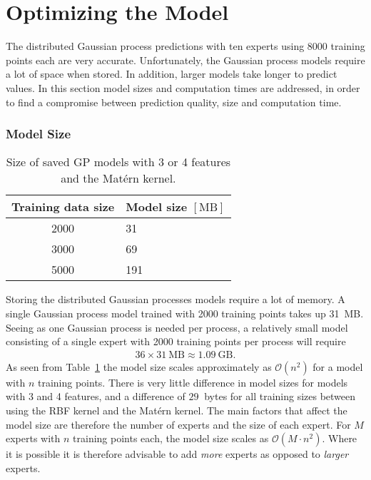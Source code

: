 \documentclass[twoside,english]{uiofysmaster}
\begin{document}
{\section{Optimizing the Model}\label{Sec:: results : The Optimal Model}

The distributed Gaussian process predictions with ten experts using 8000 training points each are very accurate. Unfortunately, the Gaussian process models require a lot of space when stored. In addition, larger models take longer to predict values. In this section model sizes and computation times are addressed, in order to find a compromise between prediction quality, size and computation time.

\subsubsection{Model Size}

\begin{table}
\centering
\begin{tabular}{@{}cl@{}} \toprule
Training data size & Model size $[\mathrm{MB}]$\\
\midrule
2000 & 31\\
3000 & 69\\
5000 & 191\\ \bottomrule
\end{tabular}
\caption{Size of saved GP models with 3 or 4 features and the Mat\'{e}rn kernel.}
\label{Tab:: results : model size vs training points}
\end{table}


Storing the distributed Gaussian processes models require a lot of memory. A single Gaussian process model trained with 2000 training points takes up 31~MB. Seeing as one Gaussian process is needed per process, a relatively small model consisting of a single expert with 2000 training points per process will require
\begin{align}
36 \times 31~ \text{MB} \approx 1.09~\text{GB}.
\end{align}
As seen from Table~\ref{Tab:: results : model size vs training points} the model size scales approximately as $\mathcal{O}( n^2)$ for a model with $n$ training points. There is very little difference in model sizes for models with 3 and 4 features, and a difference of $29~$ bytes for all training sizes between using the RBF kernel and the Mat\'{e}rn kernel. The main factors that affect the model size are therefore the number of experts and the size of each expert. For $M$ experts with $n$ training points each, the model size scales as $\mathcal{O}(M\cdot n^2)$. Where it is possible it is therefore advisable to add \textit{more} experts as opposed to \textit{larger} experts.  

}
\end{document}

